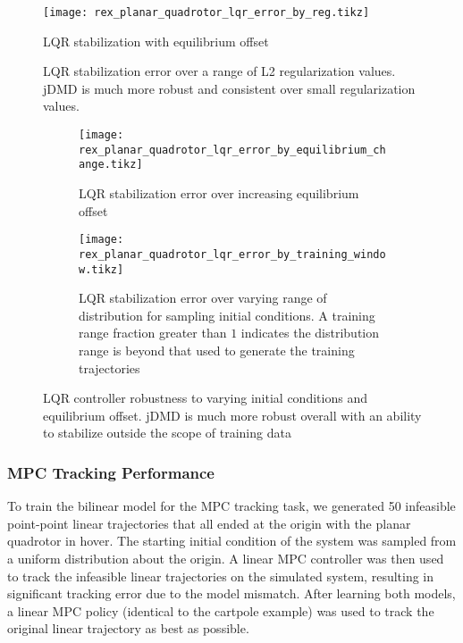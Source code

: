 \documentclass{article}
\begin{document}
\begin{figure}
    \centering
    \texttt{[image: rex\_planar\_quadrotor\_lqr\_error\_by\_reg.tikz]}
    \caption{LQR stabilization with equilibrium offset}
    \label{fig:rex_planar_quadrotor_lqr_error_by_reg}
    \caption{ LQR stabilization error over a range of L2 regularization values. jDMD is much more robust and consistent over small regularization values.}
\end{figure}

\begin{figure}
    \centering
    \begin{subfigure}[t]{0.45\textwidth}
        \texttt{[image: rex\_planar\_quadrotor\_lqr\_error\_by\_equilibrium\_change.tikz]}
        \caption{LQR stabilization error over increasing equilibrium offset}
        \label{fig:rex_planar_quadrotor_lqr_error_by_equilibrium_change}
    \end{subfigure}
    \begin{subfigure}[t]{0.45\textwidth}
        \texttt{[image: rex\_planar\_quadrotor\_lqr\_error\_by\_training\_window.tikz]}
        \caption{LQR stabilization error over varying range of distribution for sampling initial conditions. A training range fraction greater than $1$ indicates the distribution range is beyond that used to generate the training trajectories}
        \label{fig:rex_planar_quadrotor_lqr_error_by_training_window}
    \end{subfigure}
    \caption{ LQR controller robustness to varying initial conditions and equilibrium offset. jDMD is much more robust overall with an ability to stabilize outside the scope of training data }
\end{figure}

\subsubsection{MPC Tracking Performance}

To train the bilinear model for the MPC tracking task, we generated 50 infeasible point-point
linear trajectories that all ended at the origin with the planar quadrotor in hover. The starting
initial condition of the system was sampled from a uniform distribution about the origin.
A linear MPC controller was then used to track the infeasible linear trajectories on the
simulated system, resulting in significant tracking error due to the model mismatch. 
After learning both models, a linear MPC policy (identical to the cartpole example) was
used to track the original linear trajectory as best as possible.
\end{document}
